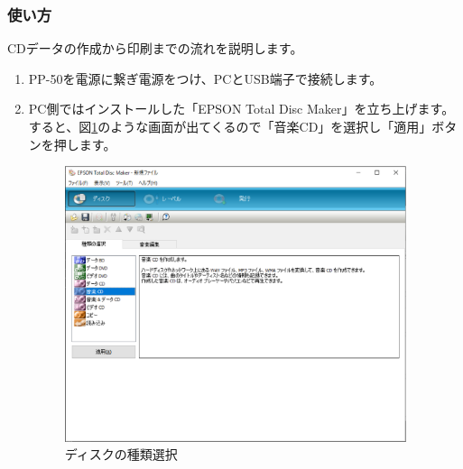 \documentclass[11pt,a4paper]{jsarticle}
\begin{document}
                \subsubsection{使い方}
                    CDデータの作成から印刷までの流れを説明します。

                    \begin{enumerate}
                        \item PP-50を電源に繋ぎ電源をつけ、PCとUSB端子で接続します。
                
                        \item PC側ではインストールした「EPSON Total Disc Maker」を立ち上げます。
                        すると、図\ref{fig:pp5001}のような画面が出てくるので「音楽CD」を選択し「適用」ボタンを押します。

                        \begin{figure}[H]
                            \begin{center}
                            \includegraphics[width=10.0cm]{./image/pp5001.eps}
                            \caption{ディスクの種類選択}
                            \label{fig:pp5001}
                            \end{center}
                        \end{figure}


\end{enumerate}
\end{document}
